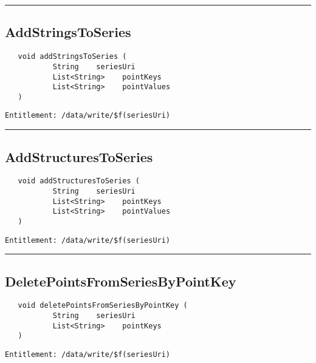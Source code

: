 \rule{12cm}{2pt}
\subsection{AddStringsToSeries}
\label{Api:AddStringsToSeries}
\begin{verbatim}
   void addStringsToSeries (
           String    seriesUri
           List<String>    pointKeys
           List<String>    pointValues
   )
\end{verbatim}
\begin{Verbatim}[fontsize=\small, formatcom=\color{Maroon}]
  Entitlement: /data/write/$f(seriesUri)
\end{Verbatim}



\rule{12cm}{2pt}
\subsection{AddStructuresToSeries}
\label{Api:AddStructuresToSeries}
\begin{verbatim}
   void addStructuresToSeries (
           String    seriesUri
           List<String>    pointKeys
           List<String>    pointValues
   )
\end{verbatim}
\begin{Verbatim}[fontsize=\small, formatcom=\color{Maroon}]
  Entitlement: /data/write/$f(seriesUri)
\end{Verbatim}



\rule{12cm}{2pt}
\subsection{DeletePointsFromSeriesByPointKey}
\label{Api:DeletePointsFromSeriesByPointKey}
\begin{verbatim}
   void deletePointsFromSeriesByPointKey (
           String    seriesUri
           List<String>    pointKeys
   )
\end{verbatim}
\begin{Verbatim}[fontsize=\small, formatcom=\color{Maroon}]
  Entitlement: /data/write/$f(seriesUri)
\end{Verbatim}



